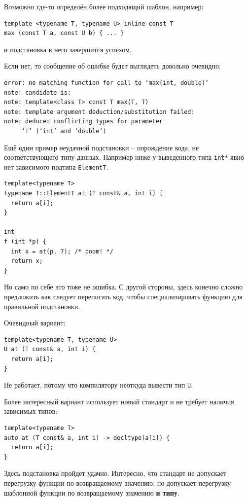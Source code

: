 \documentclass[a4paper,12pt,oneside]{book}
\begin{document}
Возможно где-то определён более подходящий шаблон, например:

\begin{lstlisting}
template <typename T, typename U> inline const T 
max (const T a, const U b) { ... }
\end{lstlisting}

и подстановка в него завершится успехом.

Если нет, то сообщение об ошибке будет выглядеть довольно очевидно:

\begin{verbatim}
error: no matching function for call to ‘max(int, double)’
note: candidate is:
note: template<class T> const T max(T, T)
note: template argument deduction/substitution failed:
note: deduced conflicting types for parameter 
     ‘T’ (‘int’ and ‘double’)
\end{verbatim}

Ещё один пример неудачной подстановки -- порождение кода, не соответствующего типу данных. Например ниже у выведенного типа \lstinline!int*! явно нет зависимого подтипа \lstinline!ElementT!.

\begin{lstlisting}
template<typename T>
typename T::ElementT at (T const& a, int i) {
  return a[i];
}

int
f (int *p) {
  int x = at(p, 7); /* boom! */
  return x;
}
\end{lstlisting}

Но само по себе это тоже не ошибка. С другой стороны, здесь конечно сложно предложить как следует переписать код, чтобы специализировать функцию для правильной подстановки. 

Очевидный вариант:

\begin{lstlisting}
template<typename T, typename U>
U at (T const& a, int i) {
  return a[i];
}
\end{lstlisting}

Не работает, потому что компилятору неоткуда вывести тип \lstinline!U!.

Более интересный вариант использует новый стандарт и не требует наличия зависимых типов:

\begin{lstlisting}
template<typename T>
auto at (T const& a, int i) -> decltype(a[i]) {
  return a[i];
}
\end{lstlisting}

Здесь подстановка пройдет удачно. Интересно, что стандарт не допускает перегрузку функции по возвращаемому значению, но допускает перегрузку шаблонной функции по возвращаемому значению \textbf{и типу}.
\end{document}
